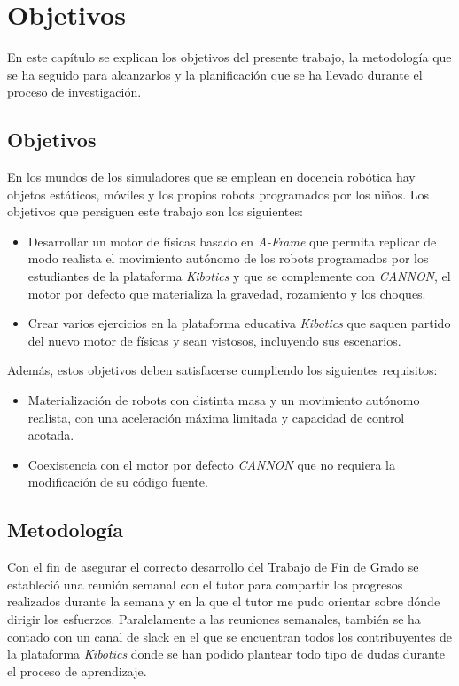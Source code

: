 \chapter{Objetivos}
\label{chap:objetivos} 
En este capítulo se explican los objetivos del presente trabajo, la metodología que se ha seguido para alcanzarlos y la planificación que se ha llevado durante el proceso de investigación.
   
\section{Objetivos}
En los mundos de los simuladores que se emplean en docencia robótica hay objetos estáticos, móviles y los propios robots programados por los niños. Los objetivos que persiguen este trabajo son los siguientes:

\begin{itemize}
    \item Desarrollar un motor de físicas basado en \textit{A-Frame} que permita replicar de modo realista el movimiento autónomo de los robots programados por los estudiantes de la plataforma \textit{Kibotics} y que se complemente con \textit{CANNON}, el motor por defecto que materializa la gravedad, rozamiento y los choques.
    \item Crear varios ejercicios en la plataforma educativa \textit{Kibotics} que saquen partido del nuevo motor de físicas y sean vistosos, incluyendo sus escenarios.
\end{itemize}

Además, estos objetivos deben satisfacerse cumpliendo los siguientes requisitos:

\begin{itemize}
    \item Materialización de robots con distinta masa y un movimiento autónomo realista, con una aceleración máxima limitada y capacidad de control acotada.
    \item Coexistencia con el motor por defecto \textit{CANNON} que no requiera la modificación de su código fuente.
\end{itemize}

\section{Metodología}
Con el fin de asegurar el correcto desarrollo del Trabajo de Fin de Grado se estableció una reunión semanal con el tutor para compartir los progresos realizados durante la semana y en la que el tutor me pudo orientar sobre dónde dirigir los esfuerzos. Paralelamente a las reuniones semanales, también se ha contado con un canal de slack en el que se encuentran todos los contribuyentes de la plataforma \textit{Kibotics} donde se han podido plantear todo tipo de dudas durante el proceso de aprendizaje. \newline


